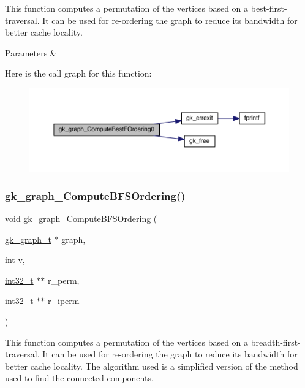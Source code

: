 This function computes a permutation of the vertices based on a best-\/first-\/traversal. It can be used for re-\/ordering the graph to reduce its bandwidth for better cache locality.


\begin{DoxyParams}{Parameters}
{\em } & \\
\hline
\end{DoxyParams}
Here is the call graph for this function\+:\nopagebreak
\begin{figure}[H]
\begin{center}
\leavevmode
\includegraphics[width=350pt]{a00077_a698b40792daaa90d9a47c2dcfd2c07d3_cgraph}
\end{center}
\end{figure}
\mbox{\label{a00077_afc3115833e0ad293dbe9fd4028b12f20}} 
\subsubsection{\texorpdfstring{gk\+\_\+graph\+\_\+\+Compute\+B\+F\+S\+Ordering()}{gk\_graph\_ComputeBFSOrdering()}}
{\footnotesize\ttfamily void gk\+\_\+graph\+\_\+\+Compute\+B\+F\+S\+Ordering (\begin{DoxyParamCaption}\item[{\hyperlink{a00638}{gk\+\_\+graph\+\_\+t} $\ast$}]{graph,  }\item[{int}]{v,  }\item[{\hyperlink{a00119_a37994e3b11c72957c6f454c6ec96d43d}{int32\+\_\+t} $\ast$$\ast$}]{r\+\_\+perm,  }\item[{\hyperlink{a00119_a37994e3b11c72957c6f454c6ec96d43d}{int32\+\_\+t} $\ast$$\ast$}]{r\+\_\+iperm }\end{DoxyParamCaption})}

This function computes a permutation of the vertices based on a breadth-\/first-\/traversal. It can be used for re-\/ordering the graph to reduce its bandwidth for better cache locality. The algorithm used is a simplified version of the method used to find the connected components.


